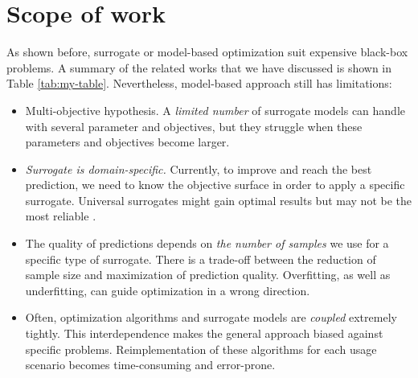     \section{Scope of work}

        As shown before, surrogate or model-based optimization suit expensive black-box problems. A summary of the related works that we have discussed is shown in Table \ref{tab:my-table}. Nevertheless, model-based approach still has limitations:
        \begin{itemize}
            \item Multi-objective hypothesis. A \emph{limited number} of surrogate models can handle with several parameter and objectives, but they struggle when these parameters and objectives become larger. 
            \item \emph{Surrogate is domain-specific.} Currently, to improve and reach the best prediction, we need to know the objective surface in order to apply a specific surrogate. Universal surrogates might gain optimal results but may not be the most reliable \cite{abs181207958, LuST19}. 
            \item The quality of predictions depends on \emph{the number of samples} we use for a specific type of surrogate. There is a trade-off between the reduction of sample size and maximization of prediction quality. Overfitting, as well as underfitting, can guide optimization in a wrong direction.
            \item Often, optimization algorithms and surrogate models are \emph{coupled} extremely tightly. This interdependence makes the general approach biased against specific problems. Reimplementation of these algorithms for each usage scenario becomes time-consuming and error-prone.
        \end{itemize}

